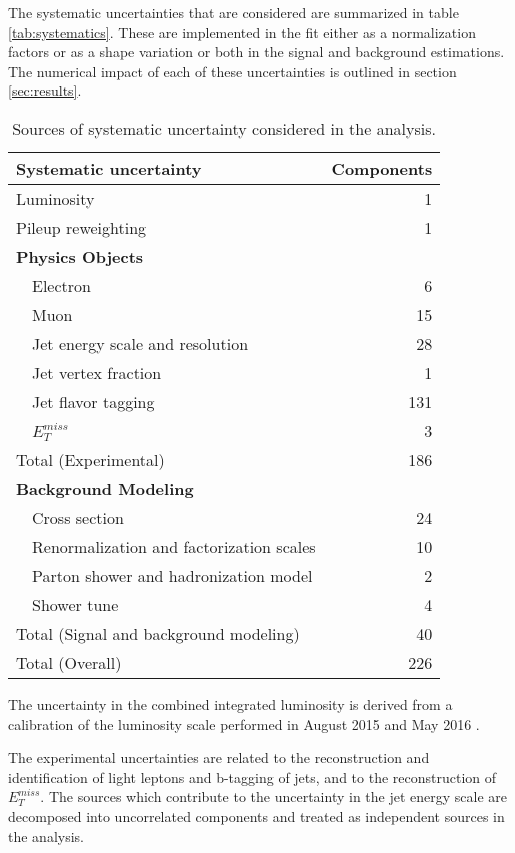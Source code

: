 
The systematic uncertainties that are considered are summarized in table \ref{tab:systematics}. These are implemented in the fit either as a normalization factors or as a shape variation or both in the signal and background estimations. The numerical impact of each of these uncertainties is outlined in section \ref{sec:results}.

\begin{table}[h]
\centering
\caption{Sources of systematic uncertainty considered in the analysis.}
\begin{tabular}{lr}
\hline\hline
Systematic uncertainty & Components  	      \\
\hline
\hline
Luminosity	& 1		      \\
Pileup reweighting 	& 1		      \\
\textbf {Physics Objects}     	&		      \\
\ \ Electron                               	& 6		      \\
\ \ Muon	& 15		      \\
\ \ Jet energy scale and resolution  	& 28                  \\
\ \ Jet vertex fraction  	& 1		      \\
\ \ Jet flavor tagging   	& 131		      \\
\ \ $E^{miss}_T$  	& 3		      \\
\hline
Total (Experimental)        & 186		     \\
\hline
\hline
\textbf {Background Modeling}          	&		      \\
\ \ Cross section                 	& 24		      \\
\ \ Renormalization and factorization scales 	& 10		      \\
\ \ Parton shower and hadronization model       	& 2		      \\
\ \ Shower tune				& 4		      \\
\hline
Total (Signal and background modeling)       & 40		     \\
\hline\hline
Total (Overall)                             & 226	      \\
\hline\hline
\end{tabular}
\label{tab:SystSummary}
\end{table}

The uncertainty in the combined integrated luminosity is derived from a calibration of the luminosity scale performed in August 2015 and May 2016 \cite{lumi}.

The experimental uncertainties are related to the reconstruction and identification of light leptons and b-tagging of jets, and to the reconstruction of $E^{miss}_T$. The sources which contribute to the uncertainty in the jet energy scale \cite{jes} are decomposed into uncorrelated components and treated as independent sources in the analysis. 

